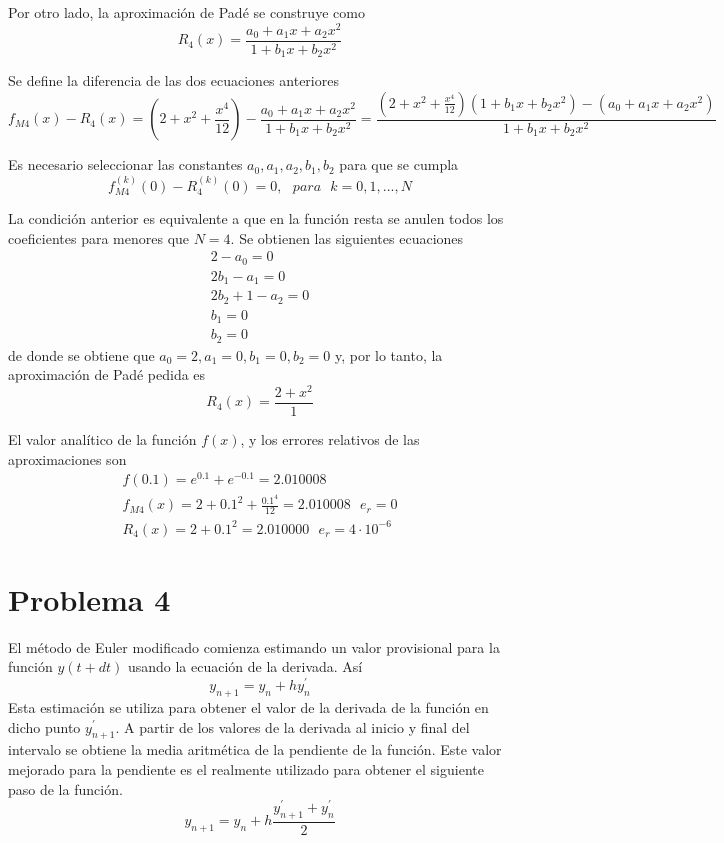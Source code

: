 \documentclass[a4paper, 12pt]{article}
\begin{document}
Por otro lado, la aproximación de Padé se construye como
\begin{equation*}
R_4(x) = \frac{a_0 + a_1x + a_2x^2}{1 + b_1x + b_2x^2}
\end{equation*} 

Se define la diferencia de las dos ecuaciones anteriores
\begin{equation*}
f_{M4}(x) - R_4(x) = (2 + x^2 + \frac{x^4}{12}) -
                    \frac{a_0 + a_1x + a_2x^2}{1 + b_1x + b_2x^2} =
                    \frac{(2 + x^2 + \frac{x^4}{12})(1 + b_1x + b_2x^2) - (a_0 + a_1x + a_2x^2)}{1 + b_1x + b_2x^2}
\end{equation*}

Es necesario seleccionar las constantes $a_0, a_1, a_2, b_1, b_2$ para que se
cumpla
\begin{equation*}
 f_{M4}^{(k)}(0) - R_4^{(k)}(0) = 0, ~~~para~~~k = 0, 1, ..., N
\end{equation*}

La condición anterior es equivalente a que en la función resta se anulen todos
los coeficientes para menores que $N=4$. Se obtienen las siguientes ecuaciones
\begin{align*}
2 - a_0 = 0\\
2b_1 - a_1 = 0\\
2b_2 + 1 - a_2 = 0\\
b_1 = 0\\
b_2 = 0
\end{align*}
de donde se obtiene que $a_0 = 2, a_1 = 0, b_1 = 0, b_2 = 0$ y, por lo tanto,
la aproximación de Padé pedida es
\begin{equation*}
R_4(x) = \frac{2 + x^2}{1}
\end{equation*}

El valor analítico de la función $f(x)$, y los errores relativos de las
aproximaciones son
\begin{align*}
f(0.1) = e^{0.1} + e^{-0.1} = 2.010008\\
f_{M4}(x) = 2 + 0.1^2 + \frac{0.1^4}{12} = 2.010008~~~e_r=0\\
R_4(x) = 2 + 0.1^2 = 2.010000~~~e_r = 4 \cdot 10^{-6}
\end{align*}

\section*{Problema 4}
El método de Euler modificado comienza estimando un valor provisional para la
función $y(t+dt)$ usando la ecuación de la derivada. Así
\begin{equation*}
 y_{n+1} = y_n + hy^{'}_n
\end{equation*}  
Esta estimación se utiliza para obtener el valor de la derivada de la función
en dicho punto $y^{'}_{n+1}$. A partir de los valores de la derivada al inicio
y final del intervalo se obtiene la media aritmética de la pendiente de la
función. Este valor mejorado para la pendiente es el realmente utilizado para
obtener el siguiente paso de la función.
\begin{equation*}
y_{n+1} = y_n + h\frac{y^{'}_{n+1} + y^{'}_{n}}{2}
\end{equation*}
\end{document}
